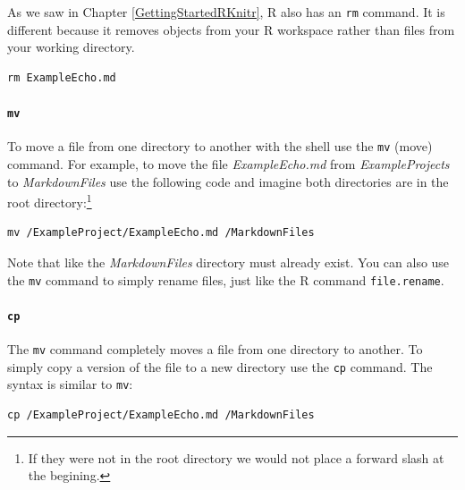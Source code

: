\documentclass[krantz1]{krantz}
\begin{document}
As we saw in Chapter \ref{GettingStartedRKnitr}, R also has an \texttt{rm} command. It is different because it removes objects from your R workspace rather than files from your working directory.

\begin{knitrout}
\color{fgcolor}\begin{kframe}
\begin{verbatim}
rm ExampleEcho.md
\end{verbatim}
\end{kframe}
\end{knitrout}


\paragraph{{\tt{mv}}}

To move a file from one directory to another with the shell use the \texttt{mv} (move) command. For example, to move the file \emph{ExampleEcho.md} from \emph{ExampleProjects} to \emph{MarkdownFiles} use the following code and imagine both directories are in the root directory:\footnote{If they were not in the root directory we would not place a forward slash at the begining.}

\begin{knitrout}
\color{fgcolor}\begin{kframe}
\begin{verbatim}
mv /ExampleProject/ExampleEcho.md /MarkdownFiles
\end{verbatim}
\end{kframe}
\end{knitrout}


\noindent Note that like the \emph{MarkdownFiles} directory must already exist. You can also use the \texttt{mv} command to simply rename files, just like the R command \texttt{file.rename}.

\paragraph{{\tt{cp}}}

The \texttt{mv} command completely moves a file from one directory to another. To simply copy a version of the file to a new directory use the \texttt{cp} command. The syntax is similar to \texttt{mv}:

\begin{knitrout}
\color{fgcolor}\begin{kframe}
\begin{verbatim}
cp /ExampleProject/ExampleEcho.md /MarkdownFiles
\end{verbatim}
\end{kframe}
\end{knitrout}
\end{document}
